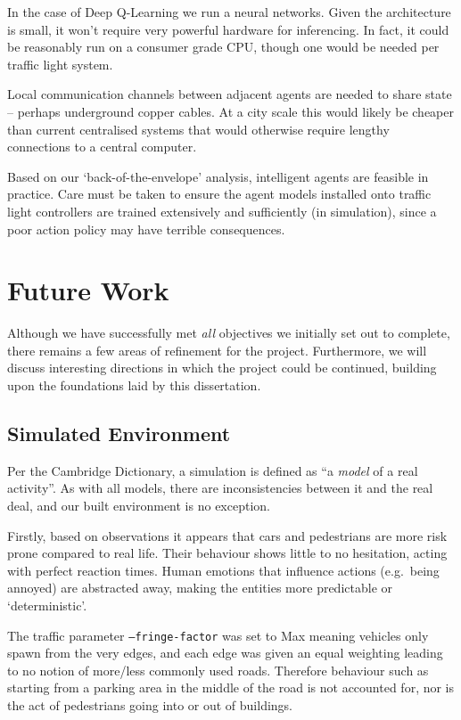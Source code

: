 \documentclass[a4paper]{report}
\begin{document}
In the case of Deep Q-Learning we run a neural networks. Given the architecture is small, it won't require very powerful hardware for inferencing. In fact, it could be reasonably run on a consumer grade CPU, though one would be needed per traffic light system.

Local communication channels between adjacent agents are needed to share state -- perhaps underground copper cables. At a city scale this would likely be cheaper than current centralised systems that would otherwise require lengthy connections to a central computer.

Based on our `back-of-the-envelope' analysis, intelligent agents are feasible in practice. Care must be taken to ensure the agent models installed onto traffic light controllers are trained extensively and sufficiently (in simulation), since a poor action policy may have terrible consequences.

\section{Future Work}

Although we have successfully met \emph{all} objectives we initially set out to complete, there remains a few areas of refinement for the project. Furthermore, we will discuss interesting directions in which the project could be continued, building upon the foundations laid by this dissertation.

\subsection{Simulated Environment} 

Per the Cambridge Dictionary, a simulation is defined as ``a \emph{model} of a real activity''. As with all models, there are inconsistencies between it and the real deal, and our built environment is no exception.

Firstly, based on observations it appears that cars and pedestrians are more risk prone compared to real life. Their behaviour shows little to no hesitation, acting with perfect reaction times. Human emotions that influence actions (e.g.\ being annoyed) are abstracted away, making the entities more predictable or `deterministic'.

The traffic parameter \texttt{--fringe-factor} was set to Max meaning vehicles only spawn from the very edges, and each edge was given an equal weighting leading to no notion of more/less commonly used roads. Therefore behaviour such as starting from a parking area in the middle of the road is not accounted for, nor is the act of pedestrians going into or out of buildings.
\end{document}
